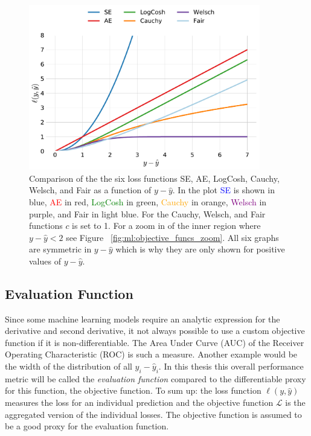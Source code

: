 \documentclass[a4paper, twoside, nobib]{tufte-book}
\newcommand{\figref}[1]{Figure ~\ref{#1}}
\begin{document}
\begin{figure}
  \includegraphics[width=0.9\textwidth]{figures/objective_functions/objective_functions.pdf}
  \caption[Comparison of different objective functions.]
    {Comparison of the the six loss functions SE, AE, LogCosh, Cauchy, Welsch, and Fair as a function of $y-\hat{y}$. In the plot \textcolor{blue}{SE} is shown in blue, \textcolor{red}{AE} in red, \textcolor{green}{LogCosh} in green, \textcolor{orange}{Cauchy} in orange, \textcolor{purple}{Welsch} in purple, and \textcolor{light-blue}{Fair} in light blue. For the Cauchy, Welsch, and Fair functions $c$ is set to 1. For a zoom in of the inner region 
    where $y-\hat{y}<2$ see \figref{fig:ml:objective_funcs_zoom}. All six graphs are symmetric in $y-\hat{y}$ which is why they are only shown for positive values of $y-\hat{y}$.
    }
  \label{fig:ml:objective_funcs}
\end{figure}

\subsection{Evaluation Function}
Since some machine learning models require an analytic expression for the derivative and second derivative, it not always possible to use a custom objective function if it is non-differentiable. The Area Under Curve (AUC) of the Receiver Operating Characteristic (ROC) is such a measure. Another example would be the width of the distribution of all $y_i-\hat{y}_i$. In this thesis this overall performance metric will be called the \emph{evaluation function} compared to the differentiable proxy for this function, the objective function. To sum up: the loss function $\ell(y, \hat{y})$ measures the loss for an individual prediction and the objective function $\mathcal{L}$ is the aggregated version of the individual losses. The objective function is assumed to be a good proxy for the evaluation function. 
\end{document}
